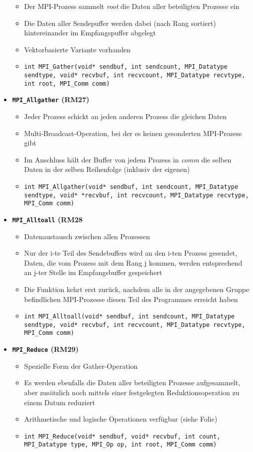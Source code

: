 \begin{itemize}
	\begin{itemize}
		\item Der MPI-Prozess sammelt \textit{root} die Daten aller beteiligten Prozesse ein
		\item Die Daten aller Sendepuffer werden dabei (nach Rang sortiert) hintereinander im Empfangspuffer abgelegt
		\item Vektorbasierte Variante vorhanden
		\item \texttt{int MPI\_Gather(void* sendbuf, int sendcount, MPI\_Datatype sendtype, void* recvbuf, int recvcount, MPI\_Datatype recvtype, int root, MPI\_Comm comm)}
	\end{itemize}
	\item \textbf{\texttt{MPI\_Allgather} (RM27)}
	\begin{itemize}
		\item Jeder Prozess schickt an jeden anderen Prozess die gleichen Daten
		\item Multi-Broadcast-Operation, bei der es keinen gesonderten MPI-Prozess gibt
		\item Im Anschluss hält der Buffer von jedem Prozess in \textit{comm} die selben Daten in der selben Reihenfolge (inklusiv der eigenen)
		\item \texttt{int MPI\_Allgather(void* sendbuf, int sendcount, MPI\_Datatype sendtype, void* *recvbuf, int recvcount, MPI\_Datatype recvtype, MPI\_Comm comm)}
	\end{itemize}
	\item \textbf{\texttt{MPI\_Alltoall} (RM28}
	\begin{itemize}
		\item Datenaustausch zwischen allen Prozessen
		\item Nur der i-te Teil des Sendebuffers wird an den i-ten Prozess gesendet, Daten, die vom Prozess mit dem Rang j kommen, werden entsprechend an j-ter Stelle im Empfangsbuffer gespeichert
		\item Die Funktion kehrt erst zurück, nachdem alle in der angegebenen Gruppe befindlichen MPI-Prozesse diesen Teil des Programmes erreicht haben
		\item \texttt{int MPI\_Alltoall(void* sendbuf, int sendcount, MPI\_Datatype sendtype, void* recvbuf, int recvcount, MPI\_Datatype recvtype, MPI\_Comm comm)}
	\end{itemize}
	\item \textbf{\texttt{MPI\_Reduce} (RM29)}
	\begin{itemize}
		\item Spezielle Form der Gather-Operation
		\item Es werden ebenfalls die Daten aller beteiligten Prozesse aufgesammelt, aber zusätzlich noch mittels einer festgelegten Reduktionsoperation zu einem Datum reduziert
		\item Arithmetische und logische Operationen verfügbar (siehe Folie)
		\item \texttt{int MPI\_Reduce(void* sendbuf, void* recvbuf, int count, MPI\_Datatype type, MPI\_Op op, int root, MPI\_Comm comm)}
	\end{itemize}
\end{itemize}




